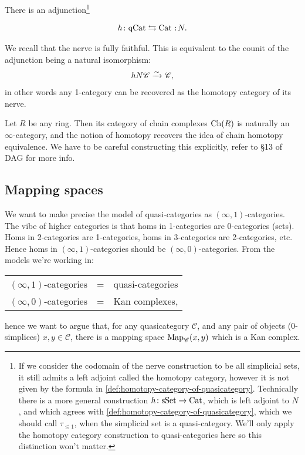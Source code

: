 \documentclass[11pt]{amsart}
\begin{document}
\begin{proposition} There is an adjunction\footnote{%
If we consider the codomain of the nerve construction to be all simplicial sets, it still admits a left adjoint called the homotopy category, however it is not given by the formula in \autoref{def:homotopy-category-of-quasicategory}. Technically there is a more general construction $h \colon \mathrm{sSet}\to \mathrm{Cat}$, which is left adjoint to $N$, and which agrees with \autoref{def:homotopy-category-of-quasicategory}, which we should call $\tau_{\le 1}$, when the simplicial set is a quasi-category. We'll only apply the homotopy category construction to quasi-categories here so this distinction won't matter.
}


\begin{align*}
    h\colon \qCat \leftrightarrows \Cat \noloc N.
\end{align*}
\end{proposition}

\begin{remark} We recall that the nerve is fully faithful. This is equivalent to the counit of the adjunction being a natural isomorphism:
\begin{align*}
    hN\mathscr{C} \xrightarrow{\sim} \mathscr{C},
\end{align*}
in other words any 1-category can be recovered as the homotopy category of its nerve.
\end{remark}

\begin{example} Let $R$ be any ring. Then its category of chain complexes $\mathrm{Ch}(R)$ is naturally an $\infty$-category, and the notion of homotopy recovers the idea of chain homotopy equivalence. We have to be careful constructing this explicitly, refer to \S13 of DAG for more info.
\end{example}


\subsection{Mapping spaces}


We want to make precise the model of quasi-categories as $(\infty,1)$-categories. The vibe of higher categories is that homs in 1-categories are 0-categories (sets). Homs in 2-categories are 1-categories, homs in 3-categories are 2-categories, etc. Hence homs in $(\infty,1)$-categories should be $(\infty,0)$-categories. From the models we're working in:

\begin{center} 
\begin{tabular}{l  l  l}
$(\infty,1)$-categories & = & quasi-categories \\
$(\infty,0)$-categories & = & Kan complexes,
\end{tabular}
\end{center}
hence we want to argue that, for any quasicategory $\mathscr{C}$, and any pair of objects (0-simplices) $x,y\in \mathscr{C}$, there is a mapping space $\mathrm{Map}_\mathscr{C}(x,y)$ which is a Kan complex.
\end{document}
